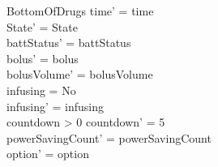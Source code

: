 \begin{schema}{BottomOfDrugs}
	time' = time\\ State' = State\\
	battStatus' = battStatus\\
	bolus' = bolus\\
	bolusVolume' = bolusVolume\\
	infusing = No\\
	infusing' = infusing\\
	countdown > 0 \land countdown' = 5\\
	powerSavingCount' = powerSavingCount\\ option' = option\\
\end{schema}


